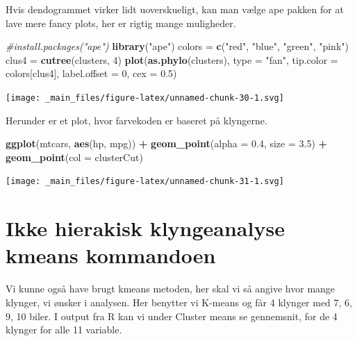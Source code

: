 \documentclass[]{book}
\newenvironment{Shaded}{\begin{snugshade}}{\end{snugshade}}
\newcommand{\CommentTok}[1]{\textcolor[rgb]{0.56,0.35,0.01}{\textit{#1}}}
\newcommand{\DataTypeTok}[1]{\textcolor[rgb]{0.13,0.29,0.53}{#1}}
\newcommand{\DecValTok}[1]{\textcolor[rgb]{0.00,0.00,0.81}{#1}}
\newcommand{\FloatTok}[1]{\textcolor[rgb]{0.00,0.00,0.81}{#1}}
\newcommand{\KeywordTok}[1]{\textcolor[rgb]{0.13,0.29,0.53}{\textbf{#1}}}
\newcommand{\NormalTok}[1]{#1}
\newcommand{\OperatorTok}[1]{\textcolor[rgb]{0.81,0.36,0.00}{\textbf{#1}}}
\newcommand{\StringTok}[1]{\textcolor[rgb]{0.31,0.60,0.02}{#1}}
\begin{document}
Hvis dendogrammet virker lidt uoverskueligt, kan man vælge ape pakken for at lave mere fancy plots, her er rigtig mange muligheder.

\begin{Shaded}
\begin{Highlighting}[]
\CommentTok{#install.packages("ape")}
\KeywordTok{library}\NormalTok{(}\StringTok{"ape"}\NormalTok{)}
\NormalTok{colors =}\StringTok{ }\KeywordTok{c}\NormalTok{(}\StringTok{"red"}\NormalTok{, }\StringTok{"blue"}\NormalTok{, }\StringTok{"green"}\NormalTok{, }\StringTok{"pink"}\NormalTok{)}
\NormalTok{clus4 =}\StringTok{ }\KeywordTok{cutree}\NormalTok{(clusters, }\DecValTok{4}\NormalTok{)}
\KeywordTok{plot}\NormalTok{(}\KeywordTok{as.phylo}\NormalTok{(clusters), }\DataTypeTok{type =} \StringTok{"fan"}\NormalTok{, }\DataTypeTok{tip.color =}\NormalTok{ colors[clus4],}
     \DataTypeTok{label.offset =} \DecValTok{0}\NormalTok{, }\DataTypeTok{cex =} \FloatTok{0.5}\NormalTok{)}
\end{Highlighting}
\end{Shaded}

\texttt{[image: \_main\_files/figure-latex/unnamed-chunk-30-1.svg]}

Herunder er et plot, hvor farvekoden er baseret på klyngerne.

\begin{Shaded}
\begin{Highlighting}[]
\KeywordTok{ggplot}\NormalTok{(mtcars, }\KeywordTok{aes}\NormalTok{(hp, mpg)) }\OperatorTok{+}
\StringTok{  }\KeywordTok{geom_point}\NormalTok{(}\DataTypeTok{alpha =} \FloatTok{0.4}\NormalTok{, }\DataTypeTok{size =} \FloatTok{3.5}\NormalTok{) }\OperatorTok{+}\StringTok{ }\KeywordTok{geom_point}\NormalTok{(}\DataTypeTok{col =}\NormalTok{ clusterCut)}
\end{Highlighting}
\end{Shaded}

\texttt{[image: \_main\_files/figure-latex/unnamed-chunk-31-1.svg]}

\hypertarget{ikke-hierakisk-klyngeanalyse-kmeans-kommandoen}{%
\section{Ikke hierakisk klyngeanalyse kmeans kommandoen}\label{ikke-hierakisk-klyngeanalyse-kmeans-kommandoen}}

Vi kunne også have brugt kmeans metoden, her skal vi så angive hvor mange klynger, vi ønsker i analysen. Her benytter vi K-means og får 4 klynger med 7, 6, 9, 10 biler. I output fra R kan vi under Cluster means se gennemsnit, for de 4 klynger for alle 11 variable.
\end{document}
